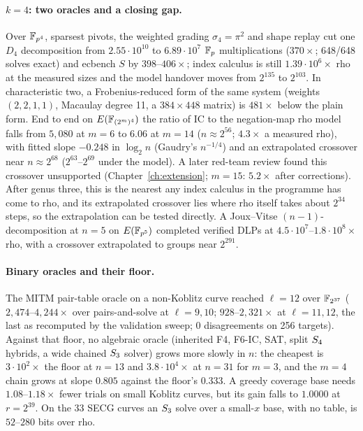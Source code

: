 \paragraph{$k=4$: two oracles and a closing gap.} Over $\mathbb{F}_{p^4}$, sparsest
pivots, the weighted grading $\sigma_4=\pi^2$ and shape replay cut one $D_4$
decomposition from $2.55\cdot10^{10}$ to $6.89\cdot10^7$ $\mathbb{F}_p$
multiplications ($370\times$; 648/648 solves exact) and ecbench $S$ by
$398$--$406\times$; index calculus is still $1.39\cdot10^6\times$ rho at
the measured sizes and the model handover moves from $2^{135}$ to $2^{103}$.
In characteristic two, a Frobenius-reduced form of the same system
(weights $(2,2,1,1)$, Macaulay degree 11, a $384\times448$ matrix) is
$481\times$ below the plain form. End to end on $E(\mathbb{F}_{(2^m)^4})$ the
ratio of IC to the negation-map rho model falls from $5{,}080$ at $m=6$ to
$6.06$ at $m=14$ ($n\approx2^{56}$; $4.3\times$ a measured rho), with fitted
slope $-0.248$ in $\log_2 n$ (Gaudry's $n^{-1/4}$) and an extrapolated
crossover near $n\approx2^{68}$ ($2^{63}$--$2^{69}$ under the model). A
later red-team review found this crossover unsupported
(Chapter~\ref{ch:extension}; $m=15$: $5.2\times$ after corrections).
After genus three, this is the nearest any index calculus in the programme
has come to rho, and its extrapolated crossover lies where rho itself takes
about $2^{34}$ steps, so the extrapolation can be tested directly. A Joux--Vitse
$(n-1)$-decomposition at $n=5$ on $E(\mathbb{F}_{p^5})$ completed verified DLPs at
$4.5\cdot10^7$--$1.8\cdot10^8\times$ rho, with a crossover extrapolated to
groups near $2^{291}$.

\paragraph{Binary oracles and their floor.} The MITM pair-table oracle on a
non-Koblitz curve reached $\ell=12$ over $\mathbb{F}_{2^{37}}$
($2{,}474$--$4{,}244\times$ over pairs-and-solve at $\ell=9,10$;
$928$--$2{,}321\times$ at $\ell=11,12$, the last as recomputed by the
validation sweep; 0 disagreements on 256 targets).
Against that floor, no algebraic oracle (inherited F4, F6-IC, SAT, split
$S_{4}$ hybrids, a wide chained $S_{3}$ solver) grows more slowly in $n$:
the cheapest is $3\cdot10^2\times$ the floor at $n=13$ and $3.8\cdot10^4\times$
at $n=31$ for $m=3$, and the $m=4$ chain grows at slope $0.805$ against the
floor's $0.333$. A greedy coverage base needs $1.08$--$1.18\times$ fewer
trials on small Koblitz curves, but its gain falls to $1.0000$ at
$r=2^{39}$. On the 33 SECG curves an $S_{3}$ solve over a small-$x$ base,
with no table, is $52$--$280$ bits over rho.

